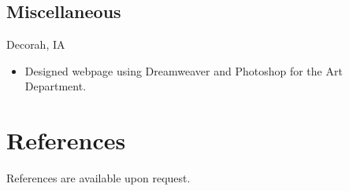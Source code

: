 \documentclass[11pt,letterpaper,sans]{moderncv} %
\begin{document}
  \subsection{Miscellaneous}
     {Decorah, IA}{}
     {\begin{itemize}
         \item Designed webpage using Dreamweaver and Photoshop for the Art Department.
     \end{itemize}}


\section{References}
\cvline{}
{References are available upon request.}




%
%
%
%

\end{document}
